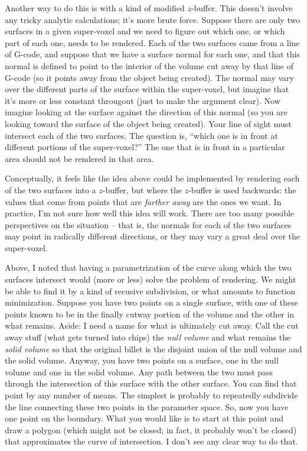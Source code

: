 \documentclass[titlepage,oneside,10pt]{article}
\begin{document}
Another way to do this is with a kind of modified $z$-buffer. This
doesn't involve any tricky analytic calculations; it's more brute
force. Suppose there are only two surfaces in a given super-voxel and
we need to figure out which one, or which part of each one, needs to
be rendered. Each of the two surfaces came from a line of G-code, and
suppose that we have a surface normal for each one, and that this
normal is defined to point to the interior of the volume cut away by
that line of G-code (so it points away from the object being
created). The normal may vary over the different parts of the surface
within the super-voxel, but imagine that it's more or less constant
througout (just to make the argument clear). Now imagine looking at
the surface against the direction of this normal (so you are looking
toward the surface of the object being created). Your line of sight
must intersect each of the two surfaces. The question is, ``which one
is in front at different portions of the super-voxel?'' The one that
is in front in a particular area should not be rendered in that area. 

Conceptually, it feels like the idea above could be implemented by
rendering each of the two surfaces into a $z$-buffer, but where the
$z$-buffer is used backwards: the values that come from points that
are \emph{farther away} are the ones we want. In practice, I'm not
sure how well this idea will work. There are too many possible
perspectives on the situation -- that is, the normals for each of the
two surfaces may point in radically different directions, or they may
vary a great deal over the super-voxel. 

Above, I noted that having a parametrization of the curve along which
the two surfaces intersect would (more or less) solve the problem of
rendering. We might be able to find it by a kind of recusive
subdivision, or what amounts to function minimization. Suppose you
have two points on a single surface, with one of these points known
to be in the finally cutway portion of the volume and the other in
what remains. Aside: I need a name for what is ultimately cut
away. Call the cut away stuff (what gets turned into chips) the
\emph{null volume} and what remains the \emph{solid volume} so that
the original billet is the disjoint union of the null volume and the solid
volume. Anyway, you have two points on a surface, one in the null
volume and one in the solid volume. Any path between the two must pass
through the intersection of this surface with the other surface. You
can find that point by any number of means. The simplest is probably
to repeatedly subdivide the line connecting these two points in the
parameter space. So, now you have one point on the boundary. What you
would like is to start at this point and draw a polygon (which might
not be closed; in fact, it probably won't be closed) that approximates
the curve of intersection. I don't see any clear way to do that.
\end{document}
